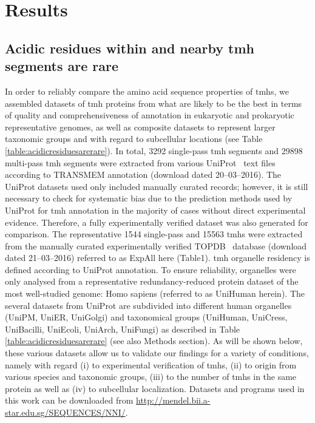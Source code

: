 \section{Results}

\subsection{Acidic residues within and nearby \gls{tmh} segments are rare}

In order to reliably compare the amino acid sequence properties of \gls{tmh}s, we assembled datasets of \gls{tmh} proteins from what are likely to be the best in terms of quality and comprehensiveness of annotation in eukaryotic and prokaryotic representative genomes, as well as composite datasets to represent larger taxonomic groups and with regard to subcellular locations (see Table \ref{table:acidicresiduesarerare}).
In total, 3292 single-pass \gls{tmh} segments and 29898 multi-pass \gls{tmh} segments were extracted from various UniProt~\cite{TheUniProtConsortium2014} text files according to TRANSMEM annotation (download dated 20--03--2016).
The UniProt datasets used only included manually curated records; however, it is still necessary to check for systematic bias due to the prediction methods used by UniProt for \gls{tmh} annotation in the majority of cases without direct experimental evidence.
Therefore, a fully experimentally verified dataset was also generated for comparison.
The representative 1544 single-pass and 15563 \gls{tmh}s were extracted from the manually curated experimentally verified TOPDB~\cite{Dobson2015} database (download dated 21--03--2016) referred to as ExpAll here (Table1).
\gls{tmh} organelle residency is defined according to UniProt annotation.
To ensure reliability, organelles were only analysed from a representative redundancy-reduced protein dataset of the most well-studied genome: Homo sapiens (referred to as UniHuman herein).
The several datasets from UniProt  are subdivided into different human organelles (UniPM, UniER, UniGolgi) and taxonomical groups (UniHuman, UniCress, UniBacilli, UniEcoli, UniArch, UniFungi) as described in Table \ref{table:acidicresiduesarerare} (see also Methods section).
As will be shown below, these various datasets allow us to validate our findings for a variety of conditions, namely with regard (i) to experimental verification of \gls{tmh}s, (ii) to origin from various species and taxonomic groups, (iii) to the number of \gls{tmh}s in the same protein as well as (iv) to subcellular localization.
Datasets and programs used in this work can be downloaded from \url{http://mendel.bii.a-star.edu.sg/SEQUENCES/NNI/}.

